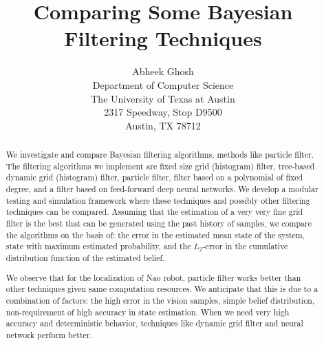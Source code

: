 \documentclass[letterpaper]{article} %
\begin{document}
%
\title{Comparing Some Bayesian Filtering Techniques}
\author{Abheek Ghosh\\
Department of Computer Science \\
The University of Texas at Austin \\
2317 Speedway, Stop D9500 \\
Austin, TX 78712 \\
}
\maketitle
\begin{abstract}
We investigate and compare Bayesian filtering algorithms, methods like particle filter. The filtering algorithms we implement are fixed size grid (histogram) filter, tree-based dynamic grid (histogram) filter, particle filter, filter based on a polynomial of fixed degree, and a filter based on feed-forward deep neural networks. We develop a modular testing and simulation framework where these techniques and possibly other filtering techniques can be compared. Assuming that the estimation of a very very fine grid filter is the best that can be generated using the past history of samples, we compare the algorithms on the basis of: the error in the estimated mean state of the system, state with maximum estimated probability, and the $L_2$-error in the cumulative distribution function of the estimated belief.

We observe that for the localization of Nao robot, particle filter works better than other techniques given same computation resources. We anticipate that this is due to a combination of factors: the high error in the vision samples, simple belief distribution, non-requirement of high accuracy in state estimation. When we need very high accuracy and deterministic behavior, techniques like dynamic grid filter and neural network perform better.
\end{abstract}

\noindent





\end{document}
